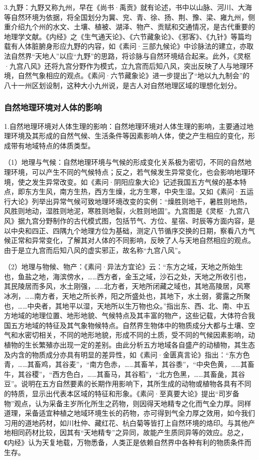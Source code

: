 \documentclass[draft,12pt]{ctexbook}
\begin{document}
3.九野：九野又称九州，早在《尚书·禹贡》就有论述，书中以山脉、河川、大海等自然环境为依据，将全国划分为冀、兖、青、徐、扬、荆、豫、梁、雍九州，侧重介绍九个州的水文、土壤、植被、湖泽、物产、贡赋和交通情况，是古代重要的地理学文献。《内经》之《生气通天论》、《六节藏象论》、《邪客》、《九针》等篇均载有人体脏腑身形应九野的内容，如《素问·三部九候论》中诊脉法的建立，亦取法自然界“天地人”以应“九野”的思路，将诊脉与自然环境结合起来。此外，《灵枢·九宫八风》还将九宫分野作为模式，立九宫而后知八风，突出反映了人与地理环境，自然气象相应的观点。《素问·六节藏象论》进一步提出了“地以九九制会”的八十一州区划设制，这种大小九州说，是古人对自然地理区域的理想化划分。

\subsubsection{自然地理环境对人体的影响}%

1.自然地理环境对人体生理的影响：自然地理环境对人体生理的影响，主要通过地理环境及其形成的自然气候、生活条件等因素影响人体，使之产生相应的变化，形成带有地域特点的体质类型。

（1）地理与气候：自然地理环境与气候的形成变化关系极为密切，不同的自然地理环境，可以产生不同的气候特点；反之，若气候发生异常变化，也会影响地理环境，使之发生异常改变。如《素问·阴阳应象大论》记述我国五方气候的基本特点，即东方生风，南方生热，西方生燥，北方生寒，中央生湿。又如《素问·五运行大论》列举出异常气候可致地理环境改变的实例：“燥胜则地干，暑胜则地热，风胜则地动，湿胜则地泥，寒胜则地裂，火胜则地固”。九宫图是《灵枢·九宫八风》据九宫分野制作的古代模式图，包括节气、方位、星宿、时辰等方面内容，是以中央和四正、四隅九个地理方位为基础，测定八节循序交换的日期，察看八方气候正常和异常变化，了解其对人体的不同影响，反映了人与天地自然相应的观点。由于是立九宫而后知八风的虚实邪正，故名称“九宫八风”。

（2）地理与物候、物产：《素问·异法方宜论》云：“东方之域，天地之所始生也，鱼盐之地，海滨傍水，……西方者，金玉之域，沙石之处，天地之所收引也，其民陵居而多风，水土刚强，……北方者，天地所闭藏之域也，其地高陵居，风寒冰冽，……南方者，天地之所长养，阳之所盛处也，其地下，水土弱，雾露之所聚也，……中央者，其地平以湿，天地所以生万物也众。”指出东、西、北、南、中五方地域的地理位置、地形地貌、气候特点及其丰富的物产，这些记载，大体符合我国五方地域的特征及其气象物候特点。自然界生物体中的物质成分大都与土壤、空气和水密切相关，不同的地形地貌，形成不同的土质，受不同的气候因素影响，动植物的生长繁殖亦出现一定的差别。由此分析五方地域各自盛产的动植物，其生态及内含的物质成分亦具有明显的差异性，如《素问·金匮真言论》指出：“东方色青，……其畜鸡，其谷麦”，“南方色赤，……其畜羊，其谷黍”，“中央色黄，……其畜牛，其谷稷”，“西方色白，……其畜马，其谷稻”，“北方色黑，……其畜彘，其谷豆”。说明在五方自然要素的长期作用影响下，其所生成的动物或植物各具有不同的特质，显示出代表本区域的特征和形象。《素问·至真要大论》提出“司岁备物”观点，认为采备主岁所化所生之药物，则因得天地精专之化而气全力厚。同样道理，采备适宜种植之地域环境生长的药物，亦可得到气全力厚之效用，如今我们习用的道地药材，如川杜仲、藏红花、杭白菊等皆打上自然环境的烙印。与其他产地相同药材比较，因其有“天地精专”之异同，故能产生质同异等的效应。总之，《内经》认为天复地载，万物悉备，人类正是依赖自然界中各种有利的物质条件而生存。
\end{document}
